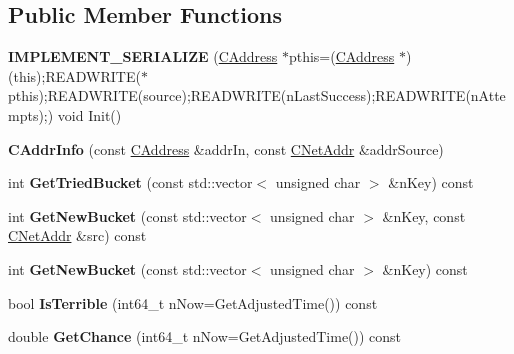 \subsection*{Public Member Functions}
\begin{DoxyCompactItemize}
\item 
\mbox{\label{class_c_addr_info_acc55a53b20a9755d23ad32f1392cc96e}} 
{\bfseries I\+M\+P\+L\+E\+M\+E\+N\+T\+\_\+\+S\+E\+R\+I\+A\+L\+I\+ZE} (\mbox{\hyperlink{class_c_address}{C\+Address}} $\ast$pthis=(\mbox{\hyperlink{class_c_address}{C\+Address}} $\ast$)(this);R\+E\+A\+D\+W\+R\+I\+TE($\ast$pthis);R\+E\+A\+D\+W\+R\+I\+TE(source);R\+E\+A\+D\+W\+R\+I\+TE(n\+Last\+Success);R\+E\+A\+D\+W\+R\+I\+TE(n\+Attempts);) void Init()
\item 
\mbox{\label{class_c_addr_info_a27e773233e8d7e7d183f138d24cc40ef}} 
{\bfseries C\+Addr\+Info} (const \mbox{\hyperlink{class_c_address}{C\+Address}} \&addr\+In, const \mbox{\hyperlink{class_c_net_addr}{C\+Net\+Addr}} \&addr\+Source)
\item 
\mbox{\label{class_c_addr_info_a2a541a16ab155a09afc6666328e920b2}} 
int {\bfseries Get\+Tried\+Bucket} (const std\+::vector$<$ unsigned char $>$ \&n\+Key) const
\item 
\mbox{\label{class_c_addr_info_a85faee0bb6c4d2bd6e63ed66c011bc75}} 
int {\bfseries Get\+New\+Bucket} (const std\+::vector$<$ unsigned char $>$ \&n\+Key, const \mbox{\hyperlink{class_c_net_addr}{C\+Net\+Addr}} \&src) const
\item 
\mbox{\label{class_c_addr_info_af5990f1a51d8b64dfcdf995355eee1d3}} 
int {\bfseries Get\+New\+Bucket} (const std\+::vector$<$ unsigned char $>$ \&n\+Key) const
\item 
\mbox{\label{class_c_addr_info_a600725db90b879aee92128a3409af8aa}} 
bool {\bfseries Is\+Terrible} (int64\+\_\+t n\+Now=Get\+Adjusted\+Time()) const
\item 
\mbox{\label{class_c_addr_info_af6788fe5a5364e63896ab9dedb8e5d40}} 
double {\bfseries Get\+Chance} (int64\+\_\+t n\+Now=Get\+Adjusted\+Time()) const
\end{DoxyCompactItemize}
